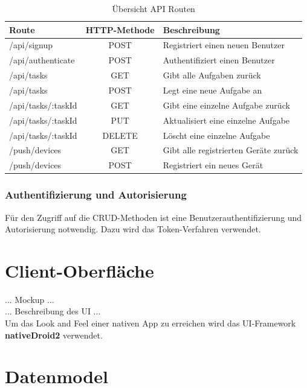 \begin{table}[h]
\centering
\begin{tabular}{l | c | l }
    \textbf{Route} & \textbf{HTTP-Methode} & \textbf{Beschreibung} \\
    \hline\hline
    /api/signup & POST & Registriert einen neuen Benutzer \\
    /api/authenticate & POST & Authentifiziert einen Benutzer \\
    \hline
    /api/tasks & GET & Gibt alle Aufgaben zurück \\
    /api/tasks & POST & Legt eine neue Aufgabe an \\
    /api/tasks/:taskId & GET & Gibt eine einzelne Aufgabe zurück \\
    /api/tasks/:taskId & PUT & Aktualisiert eine einzelne Aufgabe \\
    /api/tasks/:taskId & DELETE & Löscht eine einzelne Aufgabe \\
    \hline
    /push/devices & GET & Gibt alle registrierten Geräte zurück \\
    /push/devices & POST & Registriert ein neues Gerät \\
\end{tabular}
\caption{Übersicht API Routen}
\label{tbl_konzeption_rest}
\end{table}

\subsubsection{Authentifizierung und Autorisierung} 

Für den Zugriff auf die CRUD-Methoden ist eine Benutzerauthentifizierung und Autorisierung notwendig. Dazu wird das Token-Verfahren verwendet.

\newpage
\section{Client-Oberfläche}
\label{sec_konzeption_client-ui}


... Mockup ... \\
... Beschreibung des UI ...\\

Um das \glqq{}Look and Feel\grqq{} einer nativen App zu erreichen wird das UI-Framework \textbf{nativeDroid2} verwendet. \\

\newpage
\section{Datenmodel}
\label{sec_konzeption_datamodel}

